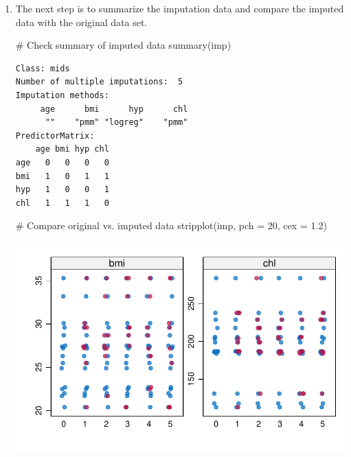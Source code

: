 \documentclass[
  letterpaper,
  DIV=11,
  numbers=noendperiod]{scrreprt}
\newenvironment{Shaded}{\begin{snugshade}}{\end{snugshade}}
\newcommand{\AttributeTok}[1]{\textcolor[rgb]{0.40,0.45,0.13}{#1}}
\newcommand{\CommentTok}[1]{\textcolor[rgb]{0.37,0.37,0.37}{#1}}
\newcommand{\DecValTok}[1]{\textcolor[rgb]{0.68,0.00,0.00}{#1}}
\newcommand{\FloatTok}[1]{\textcolor[rgb]{0.68,0.00,0.00}{#1}}
\newcommand{\FunctionTok}[1]{\textcolor[rgb]{0.28,0.35,0.67}{#1}}
\newcommand{\NormalTok}[1]{\textcolor[rgb]{0.00,0.23,0.31}{#1}}
\begin{document}
\begin{enumerate}
\def\labelenumi{\arabic{enumi}.}
\setcounter{enumi}{5}
\item
  The next step is to summarize the imputation data and compare the
  imputed data with the original data set.

\begin{Shaded}
\begin{Highlighting}[]
\CommentTok{\# Check summary of imputed data}
\FunctionTok{summary}\NormalTok{(imp)}
\end{Highlighting}
\end{Shaded}

\begin{verbatim}
Class: mids
Number of multiple imputations:  5 
Imputation methods:
     age      bmi      hyp      chl 
      ""    "pmm" "logreg"    "pmm" 
PredictorMatrix:
    age bmi hyp chl
age   0   0   0   0
bmi   1   0   1   1
hyp   1   0   0   1
chl   1   1   1   0
\end{verbatim}

\begin{Shaded}
\begin{Highlighting}[]
\CommentTok{\# Compare original vs. imputed data}
\FunctionTok{stripplot}\NormalTok{(imp, }\AttributeTok{pch =} \DecValTok{20}\NormalTok{, }\AttributeTok{cex =} \FloatTok{1.2}\NormalTok{)}
\end{Highlighting}
\end{Shaded}

  \includegraphics{guide_files/figure-pdf/unnamed-chunk-6-1.pdf}
\end{enumerate}
\end{document}

